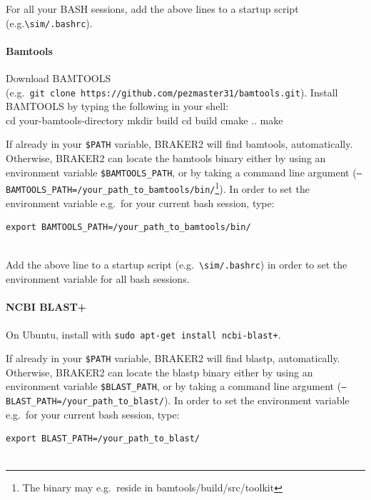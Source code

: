 \documentclass[]{article}
\let\oldparagraph\paragraph
\renewcommand{\paragraph}[1]{\oldparagraph{#1}\mbox{}}
\begin{document}
For all your BASH sessions, add the above lines to a startup script
(e.g.\texttt{\textbackslash{}sim/.bashrc}).

\paragraph{Bamtools}\label{bamtools}

Download BAMTOOLS
(e.g.~\texttt{git\ clone\ https://github.com/pezmaster31/bamtools.git}).
Install BAMTOOLS by typing the following in your shell:\\
cd your-bamtools-directory mkdir build cd build cmake .. make

If already in your \texttt{\$PATH} variable, BRAKER2 will find bamtools,
automatically. Otherwise, BRAKER2 can locate the bamtools binary either
by using an environment variable \texttt{\$BAMTOOLS\_PATH}, or by taking
a command line argument
(\texttt{–BAMTOOLS\_PATH=/your\_path\_to\_bamtools/bin/}\footnote{The
  binary may e.g.~reside in bamtools/build/src/toolkit}). In order to
set the environment variable e.g.~for your current bash session, type:

\begin{verbatim}
export BAMTOOLS_PATH=/your_path_to_bamtools/bin/ 
    
\end{verbatim}

Add the above line to a startup script
(e.g.~\texttt{\textbackslash{}sim/.bashrc}) in order to set the
environment variable for all bash sessions.

\paragraph{NCBI BLAST+}\label{ncbi-blast}

On Ubuntu, install with \texttt{sudo\ apt-get\ install\ ncbi-blast+}.

If already in your \texttt{\$PATH} variable, BRAKER2 will find blastp,
automatically. Otherwise, BRAKER2 can locate the blastp binary either by
using an environment variable \texttt{\$BLAST\_PATH}, or by taking a
command line argument (\texttt{–BLAST\_PATH=/your\_path\_to\_blast/}).
In order to set the environment variable e.g.~for your current bash
session, type:

\begin{verbatim}
export BLAST_PATH=/your_path_to_blast/ 
    
\end{verbatim}
\end{document}
